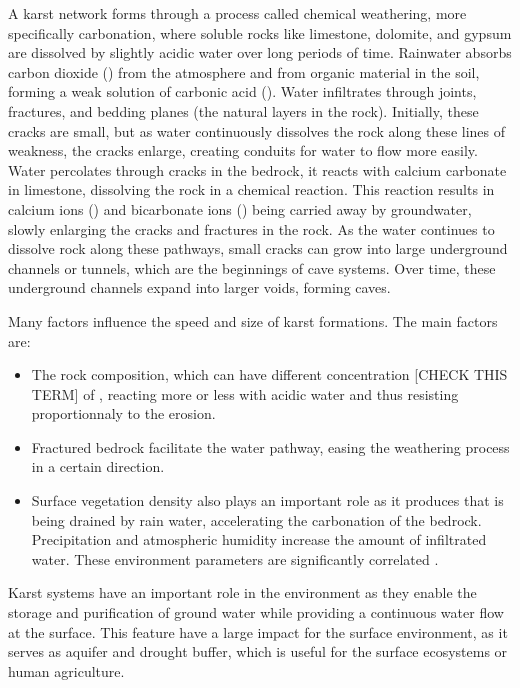 A karst network forms through a process called chemical weathering, more specifically carbonation, where soluble rocks like limestone, dolomite, and gypsum are dissolved by slightly acidic water over long periods of time.  Rainwater absorbs carbon dioxide () from the atmosphere and from organic material in the soil, forming a weak solution of carbonic acid (). Water infiltrates through joints, fractures, and bedding planes (the natural layers in the rock). Initially, these cracks are small, but as water continuously dissolves the rock along these lines of weakness, the cracks enlarge, creating conduits for water to flow more easily. Water percolates through cracks in the bedrock, it reacts with calcium carbonate in limestone, dissolving the rock in a chemical reaction. This reaction results in calcium ions () and bicarbonate ions () being carried away by groundwater, slowly enlarging the cracks and fractures in the rock. As the water continues to dissolve rock along these pathways, small cracks can grow into large underground channels or tunnels, which are the beginnings of cave systems. Over time, these underground channels expand into larger voids, forming caves.

Many factors influence the speed and size of karst formations. The main factors are:
\begin{itemize}
    \item The rock composition, which can have different concentration [CHECK THIS TERM] of , reacting more or less with acidic water and thus resisting proportionnaly to the erosion.
    \item Fractured bedrock facilitate the water pathway, easing the weathering process in a certain direction. 
    \item Surface vegetation density also plays an important role as it produces  that is being drained by rain water, accelerating the carbonation of the bedrock. Precipitation and atmospheric humidity increase the amount of infiltrated water. These environment parameters are significantly correlated \cite{Bari2021}.
\end{itemize}

Karst systems have an important role in the environment as they enable the storage and purification of ground water while providing a continuous water flow at the surface. This feature have a large impact for the surface environment, as it serves as aquifer and drought buffer, which is useful for the surface ecosystems or human agriculture.

